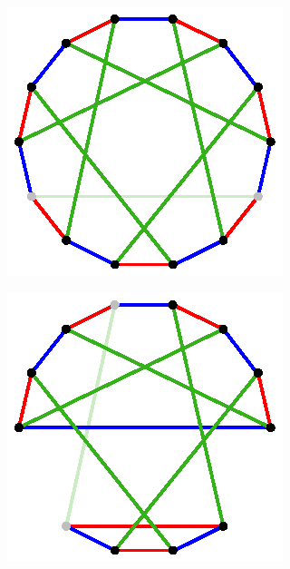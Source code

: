\documentclass[11pt, oneside]{amsart}
\theoremstyle{theorem}
\theoremstyle{definition}
\theoremstyle{theorem}
\begin{document}
\begin{figure}[h!]
\begin{subfigure}{.24\textwidth}
  \centering
  \includegraphics[width=.9\linewidth]{heawood1.eps}
  \label{ox1}
\end{subfigure}%
\begin{subfigure}{.24\textwidth}
  \centering
  \includegraphics[width=.9\linewidth]{heawood2.eps}
  \label{ox2}
\end{subfigure}

\end{figure}
\end{document}
